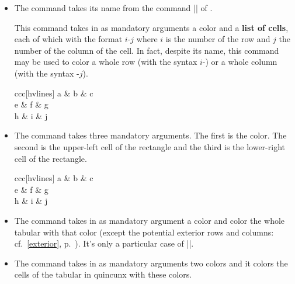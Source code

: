 \documentclass[dvipsnames]{article}
\begin{document}
\medskip
\begin{itemize}
\item The command  takes its name from
the command |\cellcolor| of .

This command takes in as mandatory arguments a color and a \textbf{list of cells}, each
of which with the format $i$-$j$ where $i$ is the number of the row and $j$ the
number of the column of the cell. In fact, despite its name, this command may
be used to color a whole row (with the syntax $i$-) or a whole column (with the
syntax -$j$).

\medskip
\begin{Code}[width=10cm,show-output,no-cell-nodes]
\begin{NiceTabular}{ccc}[hvlines]
\CodeBefore
  \emph{}
\Body
  a & b & c \\ 
  e & f & g \\ 
  h & i & j \\ 
\end{NiceTabular}
\end{Code}

\bigskip
\item The command  takes three
mandatory arguments. The first is the color. The second is the upper-left cell
of the rectangle and the third is the lower-right cell of the rectangle.

\medskip
\begin{Code}[width=10cm,show-output,no-cell-nodes]
\begin{NiceTabular}{ccc}[hvlines]
\CodeBefore
  \emph{}
\Body
  a & b & c \\ 
  e & f & g \\ 
  h & i & j \\ 
\end{NiceTabular}
\end{Code}


\bigskip
\item The command  takes in as mandatory
argument a color and color the whole tabular with that color (except the
potential exterior rows and columns: cf.~\ref{exterior}, p.~\pageref{exterior}).
It's only a particular case of |\rectanglecolor|.


\bigskip
\item The command  takes in as
mandatory arguments two colors and it colors the cells of the tabular in
quincunx with these colors.


\end{itemize}
\end{document}
